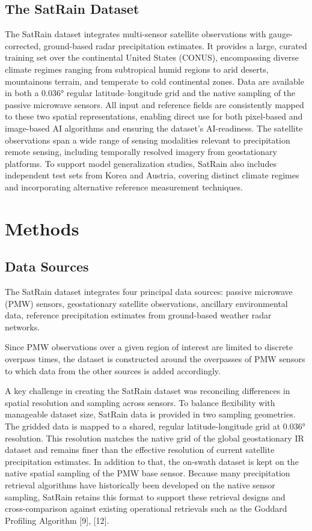 \documentclass[11pt]{article}
\begin{document}
\subsection{The SatRain Dataset}

The SatRain dataset integrates multi-sensor satellite observations with
gauge-corrected, ground-based radar precipitation estimates. It provides a
large, curated training set over the continental United States (CONUS),
encompassing diverse climate regimes ranging from subtropical humid regions to
arid deserts, mountainous terrain, and temperate to cold continental zones. Data
are available in both a 0.036° regular latitude–longitude grid and the native
sampling of the passive microwave sensors. All input and reference fields are
consistently mapped to these two spatial representations, enabling direct use
for both pixel-based and image-based AI algorithms and ensuring the dataset’s
AI-readiness. The satellite observations span a wide range of sensing modalities
relevant to precipitation remote sensing, including temporally resolved imagery
from geostationary platforms. To support model generalization studies, SatRain
also includes independent test sets from Korea and Austria, covering distinct
climate regimes and incorporating alternative reference measurement techniques.

\section{Methods}

\subsection{Data Sources}


The SatRain dataset integrates four principal data sources: passive microwave
(PMW) sensors, geostationary satellite observations, ancillary environmental
data, reference precipitation estimates from ground-based weather radar
networks.

Since PMW observations over a given region of interest are limited to discrete
overpass times, the dataset is constructed around the overpasses of PMW sensors
to which data from the other sources is added accordingly.

A key challenge in creating the SatRain dataset was reconciling differences in
spatial resolution and sampling across sensors. To balance flexibility with
manageable dataset size, SatRain data is provided in two sampling geometries.
The gridded data is mapped to a shared, regular latitude-longitude grid at
0.036° resolution. This resolution matches the native grid of the global
geostationary IR dataset and remains finer than the effective resolution of
current satellite precipitation estimates. In addition to that, the on-swath
dataset is kept on the native spatial sampling of the PMW base sensor. Because
many precipitation retrieval algorithms have historically been developed on the
native sensor sampling, SatRain retains this format to support these retrieval
designs and cross-comparison against existing operational retrievals such as the
Goddard Profiling Algorithm [9], [12].
\end{document}
